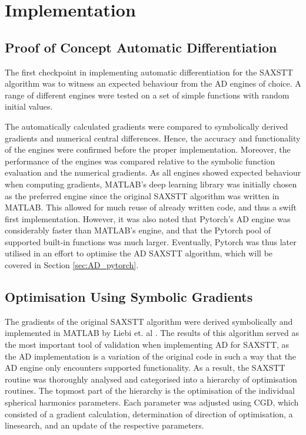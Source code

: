 
\chapter{Implementation}

\section{Proof of Concept Automatic Differentiation}\label{sec:proof_of_concept_AD}

The first checkpoint in implementing automatic differentiation for the SAXSTT algorithm was to witness an expected behaviour from the AD engines of choice.
A range of different engines were tested on a set of simple functions with random initial values.

The automatically calculated gradients were compared to symbolically derived gradients and numerical central differences.
Hence, the accuracy and functionality of the engines were confirmed before the proper implementation.
Moreover, the performance of the engines was compared relative to the symbolic function evaluation and the numerical gradients.
As all engines showed expected behaviour when computing gradients,
MATLAB's deep learning library was initially chosen as the preferred engine since the original SAXSTT algorithm was written in MATLAB.
This allowed for much reuse of already written code, and thus a swift first implementation.
However, it was also noted that Pytorch's AD engine was considerably faster than MATLAB's engine, and that the Pytorch pool of supported built-in functions was much larger.
Eventually, Pytorch was thus later utilised in an effort to optimise the AD SAXSTT algorithm, which will be covered in Section \ref{sec:AD_pytorch}.


\section{Optimisation Using Symbolic Gradients}
The gradients of the original SAXSTT algorithm were derived symbolically and implemented in MATLAB by Liebi et. al \cite{liebi2015nanostructure}.
The results of this algorithm served as the most important tool of validation when implementing AD for SAXSTT,
as the AD implementation is a variation of the original code in such a way that the AD engine only encounters supported functionality.
As a result, the SAXSTT routine was thoroughly analysed and categorised into a hierarchy of optimisation routines. %
The topmost part of the hierarchy is the optimisation of the individual spherical harmonics parameters.
Each parameter was adjusted using CGD,
which consisted of a gradient calculation, determination of direction of optimisation, a linesearch, and an update of the respective parameters.

